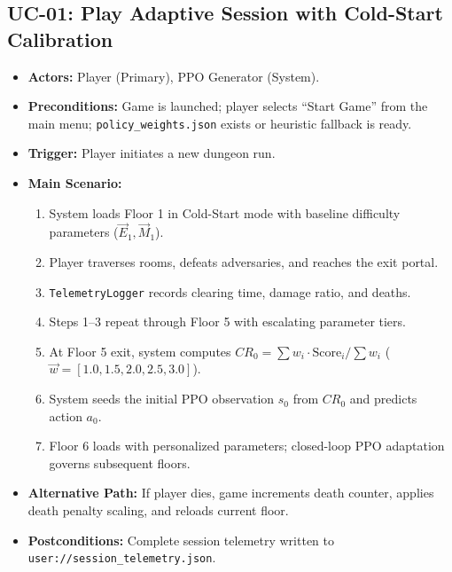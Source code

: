 \subsection{UC-01: Play Adaptive Session with Cold-Start Calibration}
\begin{itemize}
    \item \textbf{Actors:} Player (Primary), PPO Generator (System).
    \item \textbf{Preconditions:} Game is launched; player selects ``Start Game'' from the main menu; \texttt{policy\_weights.json} exists or heuristic fallback is ready.
    \item \textbf{Trigger:} Player initiates a new dungeon run.
    \item \textbf{Main Scenario:}
    \begin{enumerate}
        \item System loads Floor 1 in Cold-Start mode with baseline difficulty parameters ($\vec{E}_1, \vec{M}_1$).
        \item Player traverses rooms, defeats adversaries, and reaches the exit portal.
        \item \texttt{TelemetryLogger} records clearing time, damage ratio, and deaths.
        \item Steps 1--3 repeat through Floor 5 with escalating parameter tiers.
        \item At Floor 5 exit, system computes $CR_0 = \sum w_i \cdot \text{Score}_i / \sum w_i$ ($\vec{w} = [1.0, 1.5, 2.0, 2.5, 3.0]$).
        \item System seeds the initial PPO observation $s_0$ from $CR_0$ and predicts action $a_0$.
        \item Floor 6 loads with personalized parameters; closed-loop PPO adaptation governs subsequent floors.
    \end{enumerate}
    \item \textbf{Alternative Path:} If player dies, game increments death counter, applies death penalty scaling, and reloads current floor.
    \item \textbf{Postconditions:} Complete session telemetry written to \texttt{user://session\_telemetry.json}.
\end{itemize}

